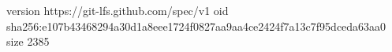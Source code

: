 version https://git-lfs.github.com/spec/v1
oid sha256:e107b43468294a30d1a8eee1724f0827aa9aa4ce2424f7a13c7f95dceda63aa0
size 2385
